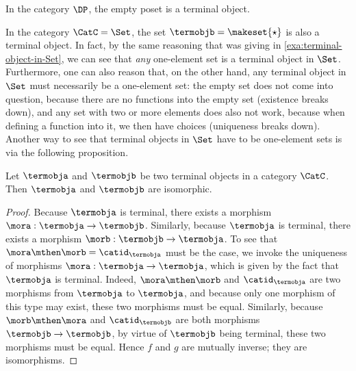 \begin{example}\label{exa:term-obj-DP}
    In the category $\DP$, the empty poset is a terminal object.
\end{example}

\begin{remark}\label{rem:terminal-object-renaming}
    In the category $\CatC = \Set$, the set $\termobjb = \makeset{ \star}$ is also a terminal object.
    In fact, by the same reasoning that was giving in \cref{exa:terminal-object-in-Set}, we can see that \emph{any} one-element set is a terminal object in $\Set$.
    Furthermore, one can also reason that, on the other hand, any terminal object in $\Set$ must necessarily be a one-element set: the empty set does not come into question, because there are no functions into the empty set (existence breaks down), and any set with two or more elements does also not work, because when defining a function into it, we then have choices (uniqueness breaks down).
    Another way to see that terminal objects in $\Set$ have to be one-element sets is via the following proposition.
\end{remark}

\begin{proposition}\label{prop:terminal-objs-isom}
    Let $\termobja$ and $\termobjb$ be two terminal objects in a category $\CatC$.
    Then $\termobja$ and $\termobjb$ are isomorphic.
\end{proposition}

\begin{proof}
    Because $\termobja$ is terminal, there exists a morphism $\mora : \termobja \to \termobjb$.
    Similarly, because $\termobja$ is terminal, there exists a morphism $\morb : \termobjb \to \termobja$.
    To see that $\mora \mthen \morb = \catid_\termobja$ must be the case, we invoke the uniqueness of morphisms $\mora : \termobja \to \termobja$, which is given by the fact that $\termobja$ is terminal.
    Indeed, $\mora \mthen \morb$ and $\catid_\termobja$ are two morphisms from $\termobja$ to $\termobja$, and because only one morphism of this type may exist, these two morphisms must be equal.
    Similarly, because $\morb \mthen \mora$ and $\catid_\termobjb$ are both morphisms $\termobjb \to \termobjb$, by virtue of $\termobjb$ being terminal, these two morphisms must be equal.
    Hence $f$ and $g$ are mutually inverse; they are isomorphisms.
\end{proof}


